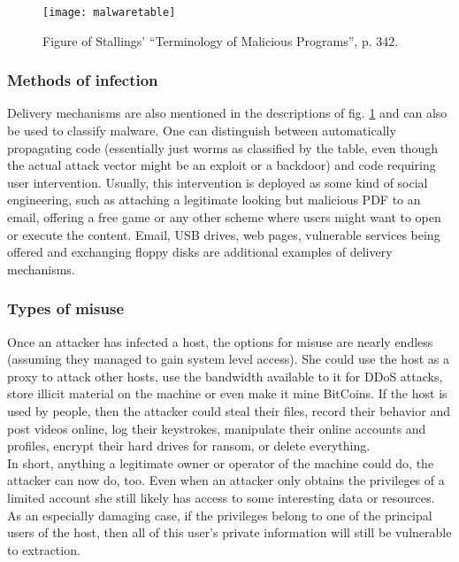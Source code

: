 \documentclass[a4paper]{llncs}
\begin{document}
\begin{figure}
    \centering
    \texttt{[image: malwaretable]}
    \caption{Figure of Stallings’ “Terminology of Malicious Programs”, p. 342.}
    \label{fig:malwaretable}
\end{figure}

\subsubsection{Methods of infection}
Delivery mechanisms are also mentioned in the descriptions of fig. \ref{fig:malwaretable} and can also be used to classify malware. One can distinguish between automatically propagating code (essentially just worms as classified by the table, even though the actual attack vector might be an exploit or a backdoor) and code requiring user intervention. Usually, this intervention is deployed as some kind of social engineering, such as attaching a legitimate looking but malicious PDF to an email, offering a free game or any other scheme where users might want to open or execute the content. Email, USB drives, web pages, vulnerable services being offered and exchanging floppy disks are additional examples of delivery mechanisms.\\

\subsubsection{Types of misuse}
Once an attacker has infected a host, the options for misuse are nearly endless (assuming they managed to gain system level access). She could use the host as a proxy to attack other hosts, use the bandwidth available to it for DDoS attacks, store illicit material on the machine or even make it mine BitCoins. If the host is used by people, then the attacker could steal their files, record their behavior and post videos online, log their keystrokes, manipulate their online accounts and profiles, encrypt their hard drives for ransom, or delete everything.\\

In short, anything a legitimate owner or operator of the machine could do, the attacker can now do, too. Even when an attacker only obtains the privileges of a limited account she still likely has access to some interesting data or resources. As an especially damaging case, if the privileges belong to one of the principal users of the host, then all of this user’s private information will still be vulnerable to extraction.
\end{document}
